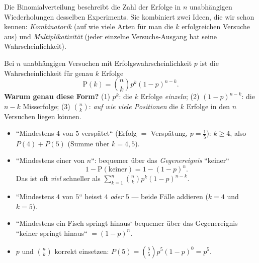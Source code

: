 


Die Binomialverteilung beschreibt die Zahl der Erfolge in $n$
unabhängigen Wiederholungen desselben Experiments. Sie kombiniert zwei
Ideen, die wir schon kennen: \emph{Kombinatorik} (auf wie viele Arten für
man die $k$ erfolgreichen Versuche aus) und \emph{Multiplikativität}
(jeder einzelne Versuchs-Ausgang hat seine Wahrscheinlichkeit).

\begin{werkzeugkasten}[Binomialverteilung]
Bei $n$ unabhängigen Versuchen mit Erfolgswahrscheinlichkeit $p$ ist die
Wahrscheinlichkeit für genau $k$ Erfolge
\begin{equation}
  \mathrm P(k)=\binom{n}{k}p^k(1-p)^{n-k}.
\end{equation}
\textbf{Warum genau diese Form?} (1) $p^k$: die $k$ Erfolge \emph{einzeln};
(2) $(1-p)^{n-k}$: die $n-k$ Misserfolge; (3) $\binom{n}{k}$: \emph{auf
wie viele Positionen} die $k$ Erfolge in den $n$ Versuchen liegen k\"onnen.
\end{werkzeugkasten}

\begin{werkzeugkasten}
\begin{itemize}
  \item ``Mindestens $4$ von $5$ versp\"atet`` (Erfolg $=$ Versp\"atung,
        $p=\tfrac15$): $k\ge4$, also $P(4)+P(5)$ (Summe über $k=4,5$).
  \item ``Mindestens einer von $n$``: bequemer über das
        \emph{Gegenereignis} ``keiner``
        \begin{equation}
          1-\mathrm P(\text{keiner})=1-(1-p)^n .
        \end{equation}
        Das ist oft \emph{viel} schneller als $\sum_{k=1}^{n}\binom nk
        p^k(1-p)^{n-k}$.
\end{itemize}
\end{werkzeugkasten}

\begin{achtung}
\begin{itemize}
  \item ``Mindestens $4$ von $5$`` heisst $4$ \emph{oder} $5$ --- beide
        F\"alle addieren ($k=4$ und $k=5$).
  \item ``Mindestens ein Fisch springt hinaus` bequemer über das
        Gegenereignis ``keiner springt hinaus`` $=(1-p)^n$.
  \item $p$ und $\binom{n}{k}$ korrekt einsetzen:
        $P(5)=\binom55 p^5(1-p)^0=p^5$.
\end{itemize}
\end{achtung}
